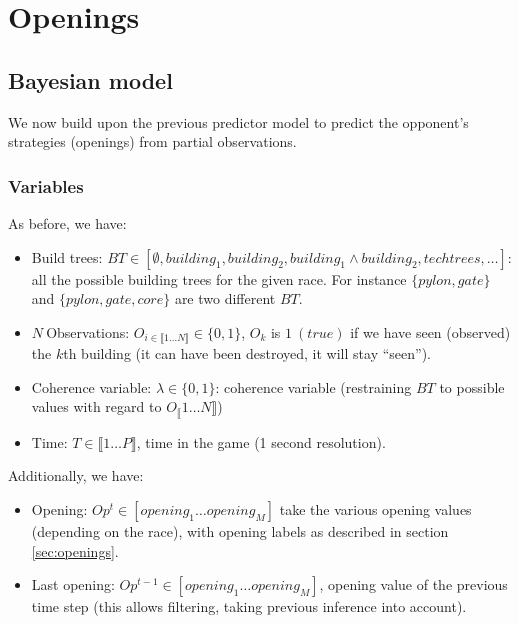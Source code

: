\clearpage
\section{Openings}
\label{sec:openingspred}

\subsection{Bayesian model}
We now build upon the previous  predictor model to predict the opponent's strategies (openings) from partial observations.



\subsubsection{Variables}
As before, we have:
\begin{itemize}
\item Build trees: $BT \in [\emptyset, building_1, building_2, building_1\wedge building_2, techtrees, \dots]$: all the possible building trees for the given race. For instance $\{pylon, gate\}$ and $\{pylon, gate, core\}$ are two different $BT$.
\item $N\ $Observations: $O_{i \in \llbracket 1\dots N \rrbracket} \in \{0, 1\}$, $O_k$ is $1\ (true)$ if we have seen (observed) the $k$th building (it can have been destroyed, it will stay ``seen'').
\item Coherence variable: $\lambda \in \{0, 1\}$: coherence variable (restraining $BT$ to possible values with regard to $O_\llbracket 1 \dots N \rrbracket$)
\item Time: $T \in \llbracket 1\dots P \rrbracket$, time in the game (1 second resolution).
\end{itemize}
Additionally, we have:
\begin{itemize}
\item Opening: $Op^t \in [opening_1 \dots opening_M]$ take the various opening values (depending on the race), with opening labels as described in section \ref{sec:openings}.
\item Last opening: $Op^{t-1} \in [opening_1 \dots opening_M]$, opening value of the previous time step (this allows filtering, taking previous inference into account).
\end{itemize}

